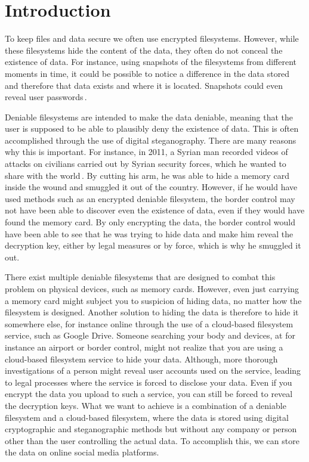 
\chapter{Introduction}
\label{ch:introduction}

To keep files and data secure we often use encrypted filesystems. However, while these filesystems hide the content of the data, they often do not conceal the existence of data. For instance, using snapshots of the filesystems from different moments in time, it could be possible to notice a difference in the data stored and therefore that data exists and where it is located. Snapshots could even reveal user passwords\,\cite{hanMultiuserSteganographicFile2010}.

Deniable filesystems are intended to make the data deniable, meaning that the user is supposed to be able to plausibly deny the existence of data. This is often accomplished through the use of digital steganography. There are many reasons why this is important. For instance, in 2011, a Syrian man recorded videos of attacks on civilians carried out by Syrian security forces, which he wanted to share with the world\,\cite{westheadHowSyrianRefugee2012}. By cutting his arm, he was able to hide a memory card inside the wound and smuggled it out of the country. However, if he would have used methods such as an encrypted deniable filesystem, the border control may not have been able to discover even the existence of data, even if they would have found the memory card. By only encrypting the data, the border control would have been able to see that he was trying to hide data and make him reveal the decryption key, either by legal measures or by force, which is why he smuggled it out.

There exist multiple deniable filesystems that are designed to combat this problem on physical devices, such as memory cards. However, even just carrying a memory card might subject you to suspicion of hiding data, no matter how the filesystem is designed. Another solution to hiding the data is therefore to hide it somewhere else, for instance online through the use of a \mbox{cloud-based} filesystem service, such as Google Drive. Someone searching your body and devices, at for instance an airport or border control, might not realize that you are using a \mbox{cloud-based} filesystem service to hide your data. Although, more thorough investigations of a person might reveal user accounts used on the service, leading to legal processes where the service is forced to disclose your data. Even if you encrypt the data you upload to such a service, you can still be forced to reveal the decryption keys. What we want to achieve is a combination of a deniable filesystem and a \mbox{cloud-based} filesystem, where the data is stored using digital cryptographic and steganographic methods but without any company or person other than the user controlling the actual data. To accomplish this, we can store the data on online social media platforms.

